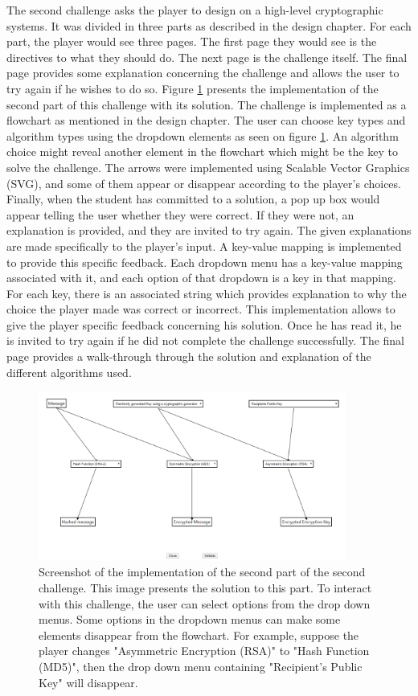\documentclass{l4proj}
\begin{document}
The second challenge asks the player to design on a high-level cryptographic systems.
It was divided in three parts as described in the design chapter.
For each part, the player would see three pages. 
The first page they would see is the directives to what they should do.
The next page is the challenge itself. 
The final page provides some explanation concerning the challenge and allows the user to try again if he wishes to do so.
Figure \ref{fig:Challenge2Imp} presents the implementation of the second part of this challenge with its solution.
The challenge is implemented as a flowchart as mentioned in the design chapter.
The user can choose key types and algorithm types using the dropdown elements as seen on figure \ref{fig:Challenge2Imp}.
An algorithm choice might reveal another element in the flowchart which might be the key to solve the challenge.
The arrows were implemented using Scalable Vector Graphics (SVG), and some of them appear or disappear according to the player's choices.
Finally, when the student has committed to a solution, a pop up box would appear telling the user whether they were correct.
If they were not, an explanation is provided, and they are invited to try again.
The given explanations are made specifically to the player's input. 
A key-value mapping is implemented to provide this specific feedback.
Each dropdown menu has a key-value mapping associated with it, 
and each option of that dropdown is a key in that mapping.
For each key, there is an associated string which provides explanation to why the choice the player made was correct or incorrect.
This implementation allows to give the player specific feedback concerning his solution.
Once he has read it, he is invited to try again if he did not complete the challenge successfully.
The final page provides a walk-through through the solution and explanation of the different algorithms used.

\begin{figure}[]
    \centering
    \includegraphics[width=0.9\textwidth, frame]{images/Challenge2Imp.PNG}
    \caption{Screenshot of the implementation of the second part of the second challenge.
    This image presents the solution to this part.
    To interact with this challenge, the user can select options from the drop down menus.
    Some options in the dropdown menus can make some elements disappear from the flowchart.
    For example, suppose the player changes "Asymmetric Encryption (RSA)" to "Hash Function (MD5)",
    then the drop down menu containing "Recipient's Public Key" will disappear.}
    \label{fig:Challenge2Imp}
\end{figure}
\end{document}
